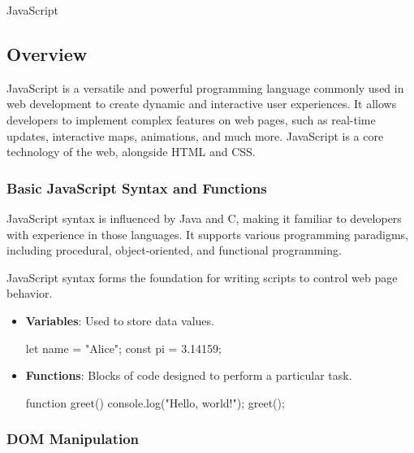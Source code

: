 \begin{notes}{JavaScript}
    \subsection*{Overview}

    JavaScript is a versatile and powerful programming language commonly used in web development to create dynamic and interactive user experiences. It allows developers to implement complex features 
    on web pages, such as real-time updates, interactive maps, animations, and much more. JavaScript is a core technology of the web, alongside HTML and CSS.
    
    \subsubsection*{Basic JavaScript Syntax and Functions}
    
    JavaScript syntax is influenced by Java and C, making it familiar to developers with experience in those languages. It supports various programming paradigms, including procedural, object-oriented, 
    and functional programming.
    
    \begin{highlight}
    
        JavaScript syntax forms the foundation for writing scripts to control web page behavior.
        
        \begin{itemize}
            \item \textbf{Variables}: Used to store data values.
    \begin{code}[JavaScript]
    let name = "Alice";
    const pi = 3.14159;
    \end{code}
            \item \textbf{Functions}: Blocks of code designed to perform a particular task.
    \begin{code}[JavaScript]
    function greet() {
        console.log("Hello, world!");
    }
    greet();
    \end{code}
        \end{itemize}
    
    \end{highlight}
    
    \subsubsection*{DOM Manipulation}
    

\end{notes}

